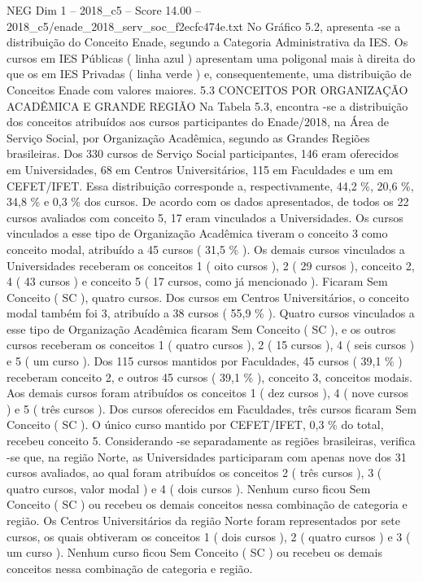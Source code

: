 \begin{textsample}{NEG Dim 1 – 2018\_c5 – Score 14.00 – 2018\_c5/enade\_2018\_serv\_soc\_f2ecfc474e.txt}
No Gráfico 5.2, apresenta -se a distribuição do Conceito Enade, segundo a Categoria Administrativa da IES.
Os cursos em IES Públicas ( linha azul ) apresentam uma poligonal mais à direita do que os em IES Privadas ( linha verde ) e, consequentemente, uma distribuição de Conceitos Enade com valores maiores. 5.3 CONCEITOS POR ORGANIZAÇÃO ACADÊMICA E GRANDE REGIÃO Na Tabela 5.3, encontra -se a distribuição dos conceitos atribuídos aos cursos participantes do Enade/2018, na Área de Serviço Social, por Organização Acadêmica, segundo as Grandes Regiões brasileiras.
Dos 330 cursos de Serviço Social participantes, 146 eram oferecidos em Universidades, 68 em Centros Universitários, 115 em Faculdades e um em CEFET/IFET.
Essa distribuição corresponde a, respectivamente, 44,2 \%, 20,6 \%, 34,8 \% e 0,3 \% dos cursos.
De acordo com os dados apresentados, de todos os 22 cursos avaliados com conceito 5, 17 eram vinculados a Universidades.
Os cursos vinculados a esse tipo de Organização Acadêmica tiveram o conceito 3 como conceito modal, atribuído a 45 cursos ( 31,5 \% ).
Os demais cursos vinculados a Universidades receberam os conceitos 1 ( oito cursos ), 2 ( 29 cursos ), conceito 2, 4 ( 43 cursos ) e conceito 5 ( 17 cursos, como já mencionado ).
Ficaram Sem Conceito ( SC ), quatro cursos.
Dos cursos em Centros Universitários, o conceito modal também foi 3, atribuído a 38 cursos ( 55,9 \% ).
Quatro cursos vinculados a esse tipo de Organização Acadêmica ficaram Sem Conceito ( SC ), e os outros cursos receberam os conceitos 1 ( quatro cursos ), 2 ( 15 cursos ), 4 ( seis cursos ) e 5 ( um curso ).
Dos 115 cursos mantidos por Faculdades, 45 cursos ( 39,1 \% ) receberam conceito 2, e outros 45 cursos ( 39,1 \% ), conceito 3, conceitos modais.
Aos demais cursos foram atribuídos os conceitos 1 ( dez cursos ), 4 ( nove cursos ) e 5 ( três cursos ).
Dos cursos oferecidos em Faculdades, três cursos ficaram Sem Conceito ( SC ).
O único curso mantido por CEFET/IFET, 0,3 \% do total, recebeu conceito 5.
Considerando -se separadamente as regiões brasileiras, verifica -se que, na região Norte, as Universidades participaram com apenas nove dos 31 cursos avaliados, ao qual foram atribuídos os conceitos 2 ( três cursos ), 3 ( quatro cursos, valor modal ) e 4 ( dois cursos ).
Nenhum curso ficou Sem Conceito ( SC ) ou recebeu os demais conceitos nessa combinação de categoria e região.
Os Centros Universitários da região Norte foram representados por sete cursos, os quais obtiveram os conceitos 1 ( dois cursos ), 2 ( quatro cursos ) e 3 ( um curso ).
Nenhum curso ficou Sem Conceito ( SC ) ou recebeu os demais conceitos nessa combinação de categoria e região.

\end{textsample}
